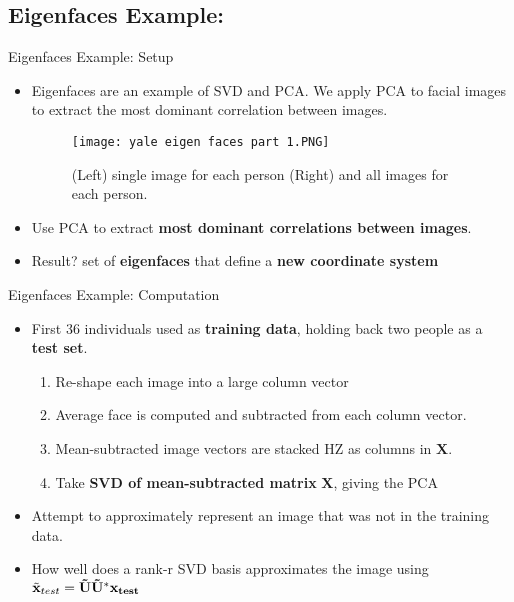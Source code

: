 \documentclass[9pt]{beamer}
\begin{document}
\subsection{Eigenfaces Example:}
\begin{frame}{Eigenfaces Example: Setup}
\begin{itemize}
    \item Eigenfaces are an example of SVD and PCA. We apply PCA to facial images to extract the most dominant correlation between images. 
    
    \begin{figure}
        \texttt{[image: yale eigen faces part 1.PNG]}
        \caption{(Left) single image for each person (Right) and all images for each person.}
    \end{figure}
    
    \item Use PCA to extract \textbf{most dominant correlations between images}.
    \item Result? set of \textbf{eigenfaces} that define a \textbf{new coordinate system}
    
\end{itemize}
\end{frame}

\begin{frame}{Eigenfaces Example: Computation}
    \begin{itemize}
        \item First 36 individuals used as \textbf{training data}, holding back two people as a \textbf{test set}. 
        \begin{enumerate}
            \item Re-shape each image into a large column vector
            \item Average face is computed and subtracted from each column vector. 
            \item Mean-subtracted image vectors are stacked HZ as columns in $\mathbf{X}$. 
            \item Take \textbf{SVD of mean-subtracted matrix} $\mathbf{X}$, giving the PCA
        \end{enumerate}
        \item Attempt to approximately represent an image that was not in the training data. 
        \item How well does a rank-r SVD basis approximates the image using
        $\Tilde{\mathbf{x}}_{test} = \mathbf{\Tilde{U}\Tilde{U}^{*}\mathbf{x}_{test}}$
    \end{itemize}
\end{frame}
\end{document}
